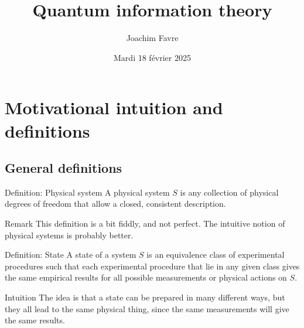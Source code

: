 \documentclass[a4paper]{article}
\title{Quantum information theory}
\author{Joachim Favre}
\date{Mardi 18 février 2025}
\begin{document}
\maketitle


\section{Motivational intuition and definitions}
\subsection{General definitions}

\begin{parag}{Definition: Physical system}
    A physical system $S$ is any collection of physical degrees of freedom that allow a closed, consistent description.

    \begin{subparag}{Remark}
        This definition is a bit fiddly, and not perfect. The intuitive notion of physical systems is probably better.
    \end{subparag}
\end{parag}

\begin{parag}{Definition: State}
    A state of a system $S$ is an equivalence class of experimental procedures such that each experimental procedure that lie in any given class gives the same empirical results for all possible measurements or physical actions on $S$.

    \begin{subparag}{Intuition}
        The idea is that a state can be prepared in many different ways, but they all lead to the same physical thing, since the same measurements will give the same results.
    \end{subparag}
\end{parag}
\end{document}
